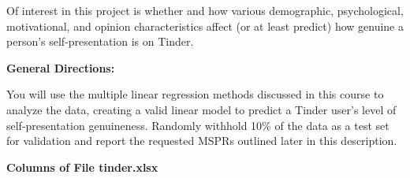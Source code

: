 \documentclass[12pt]{report}
\begin{document}
Of interest in this project is whether and
how various demographic, psychological, motivational, and opinion characteristics
affect (or at least predict) how genuine a person's self-presentation is on Tinder.\\

\vspace{1em}

\large {\bf General Directions:}
\normalsize

\vspace{1em}

You will use the multiple linear regression methods discussed
in this course to analyze the data, creating a valid linear model to
predict a Tinder user's level of self-presentation genuineness.  Randomly withhold 10\% of the data as a test set for validation and report the requested MSPRs outlined later in this description. \\


\newpage 

\large {\bf Columns of File tinder.xlsx}
\normalsize

\vspace{1em}
\end{document}
